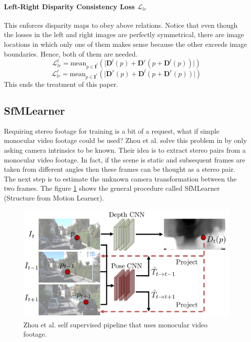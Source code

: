 \paragraph{Left-Right Disparity Consistency Loss $\mathcal{L}_{lr}$} This enforces disparity maps to obey above relations.
Notice that even though the losses in the left and right images are perfectly symmetrical, there are image locations in which only one of them makes sense because the other exceeds image boundaries.
Hence, both of them are needed.
\[
	\mathcal{L}_{lr}^{l} = \text{mean}_{p \in \mathbf{I}^{l}}
		\left(
			\big| \mathbf{D}^{l}(p) + \mathbf{D}^{r}(p + \mathbf{D}^{l}(p)) \big|
		\right)
\]\[
	\mathcal{L}_{lr}^{r} = \text{mean}_{p \in \mathbf{I}^{r}}
		\left(
			\big| \mathbf{D}^{r}(p) + \mathbf{D}^{l}(p + \mathbf{D}^{r}(p)) \big|
		\right)
\]
This ends the treatment of this paper.

\subsection{SfMLearner}
Requiring stereo footage for training is a bit of a request, what if simple monocular video footage could be used?
Zhou et al. solve this problem in \cite{SfMLearner} by only asking camera intrinsics to be known.
Their idea is to extract stereo pairs from a monocular video footage.
In fact, if the scene is static and subsequent frames are taken from different angles then these frames can be thought as a stereo pair.
The next step is to estimate the unknown camera transformation between the two frames.
The figure \ref{fig:sfmlearner} shows the general procedure called SfMLearner (Structure from Motion Learner).

\begin{figure}
	\centering
	\includegraphics[scale=0.3]{figs/sfmlearner}
	\caption{Zhou et al. self supervised pipeline \cite{SfMLearner} that uses monocular video footage. \label{fig:sfmlearner}}
\end{figure}

